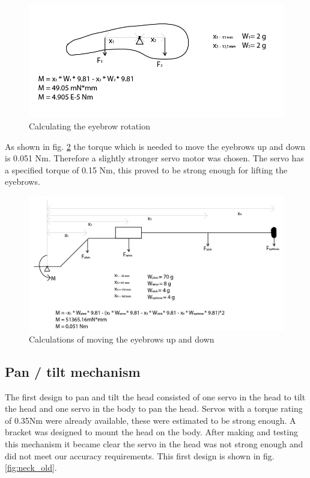 \documentclass[technical_document.tex]{subfiles}
\begin{document}
\begin{figure}[ht!]
	\centering
	\mbox{\includegraphics[scale=0.4]{Images/eyebrow_rotate.png}}
	\caption{Calculating the eyebrow rotation}
	\label{fig:eyebrow_rotate}
\end{figure}

As shown in fig. \ref{fig:eyebrow_upDown} the torque which is needed to move the eyebrows up and down is 0.051 Nm. Therefore a slightly stronger servo motor was chosen. The servo has a specified torque of 0.15 Nm, this proved to be strong enough for lifting the eyebrows.

\begin{figure}[ht!]
	\centering
	\mbox{\includegraphics[scale=0.4]{Images/eyebrow_upDown.png}}
	\caption{Calculations of moving the eyebrows up and down}
	\label{fig:eyebrow_upDown}
\end{figure}


\subsection{Pan / tilt mechanism}

The first design to pan and tilt the head consisted of one servo in the head to tilt the head and one servo in the body to pan the head. Servos with a torque rating of 0.35Nm were already available, these were estimated to be strong enough. A bracket was designed to mount the head on the body. After making and testing this mechanism it became clear the servo in the head was not strong enough and did not meet our accuracy requirements. This first design is shown in fig. \ref{fig:neck_old}.
\end{document}
